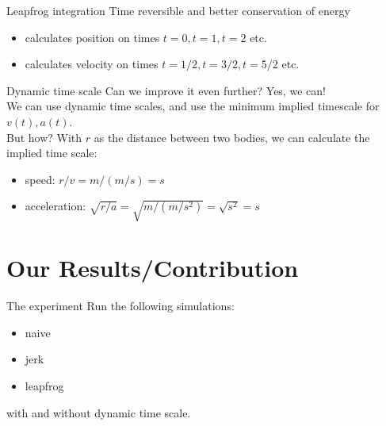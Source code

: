 \documentclass{beamer}
\begin{document}
\begin{frame}{Leapfrog integration}
        Time reversible and better conservation of energy
    \begin{itemize}
        \item
            calculates position on times $t=0, t=1, t=2$ etc.
        \item
            calculates velocity on times $t=1/2, t=3/2, t=5/2$ etc.
    \end{itemize}
\end{frame}


\begin{frame}{Dynamic time scale}
  Can we improve it even further? Yes, we can!\\
  We can use dynamic time scales, and use the minimum implied timescale for $v(t),a(t)$. \\
  But how? With $r$ as the distance between two bodies, we can calculate the implied time scale:
  \begin{itemize}
    \item speed: $r/v= m/(m/s) = s$
    \item acceleration: $\sqrt{r/a} = \sqrt{m/(m/s^2)}  = \sqrt{s^2} = s$
  \end{itemize}
\end{frame}

\section{Our Results/Contribution}


\begin{frame}{The experiment}
  Run the following simulations:
  \begin{itemize}
    \item naive
    \item jerk
    \item leapfrog
  \end{itemize}
  with and without dynamic time scale.
\end{frame}
\end{document}

